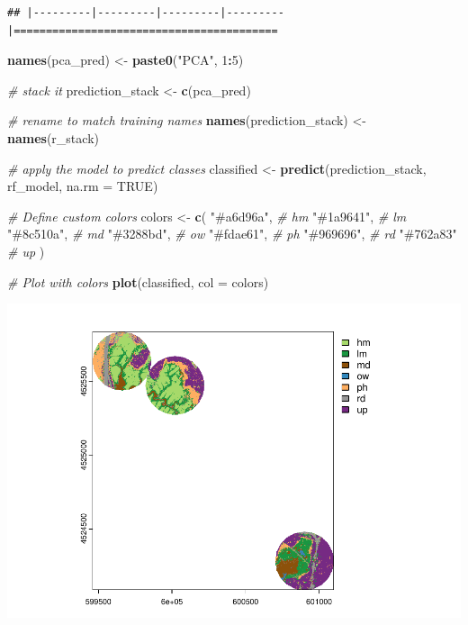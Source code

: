 \documentclass[
]{article}
\newenvironment{Shaded}{\begin{snugshade}}{\end{snugshade}}
\newcommand{\AttributeTok}[1]{\textcolor[rgb]{0.13,0.29,0.53}{#1}}
\newcommand{\CommentTok}[1]{\textcolor[rgb]{0.56,0.35,0.01}{\textit{#1}}}
\newcommand{\ConstantTok}[1]{\textcolor[rgb]{0.56,0.35,0.01}{#1}}
\newcommand{\DecValTok}[1]{\textcolor[rgb]{0.00,0.00,0.81}{#1}}
\newcommand{\FunctionTok}[1]{\textcolor[rgb]{0.13,0.29,0.53}{\textbf{#1}}}
\newcommand{\NormalTok}[1]{#1}
\newcommand{\OtherTok}[1]{\textcolor[rgb]{0.56,0.35,0.01}{#1}}
\newcommand{\SpecialCharTok}[1]{\textcolor[rgb]{0.81,0.36,0.00}{\textbf{#1}}}
\newcommand{\StringTok}[1]{\textcolor[rgb]{0.31,0.60,0.02}{#1}}
\begin{document}
\begin{verbatim}
## |---------|---------|---------|---------|=========================================                                          
\end{verbatim}

\begin{Shaded}
\begin{Highlighting}[]
\FunctionTok{names}\NormalTok{(pca\_pred) }\OtherTok{\textless{}{-}} \FunctionTok{paste0}\NormalTok{(}\StringTok{"PCA"}\NormalTok{, }\DecValTok{1}\SpecialCharTok{:}\DecValTok{5}\NormalTok{)}

\CommentTok{\# stack it}
\NormalTok{prediction\_stack }\OtherTok{\textless{}{-}} \FunctionTok{c}\NormalTok{(pca\_pred)}

\CommentTok{\# rename to match training names}
\FunctionTok{names}\NormalTok{(prediction\_stack) }\OtherTok{\textless{}{-}} \FunctionTok{names}\NormalTok{(r\_stack)}

\CommentTok{\# apply the model to predict classes}
\NormalTok{classified }\OtherTok{\textless{}{-}} \FunctionTok{predict}\NormalTok{(prediction\_stack, rf\_model, }\AttributeTok{na.rm =} \ConstantTok{TRUE}\NormalTok{)}

\CommentTok{\# Define custom colors}
\NormalTok{colors }\OtherTok{\textless{}{-}} \FunctionTok{c}\NormalTok{(}
  \StringTok{"\#a6d96a"}\NormalTok{,  }\CommentTok{\# hm  }
  \StringTok{"\#1a9641"}\NormalTok{,  }\CommentTok{\# lm  }
  \StringTok{"\#8c510a"}\NormalTok{,  }\CommentTok{\# md  }
  \StringTok{"\#3288bd"}\NormalTok{,  }\CommentTok{\# ow  }
  \StringTok{"\#fdae61"}\NormalTok{,  }\CommentTok{\# ph  }
  \StringTok{"\#969696"}\NormalTok{,  }\CommentTok{\# rd  }
  \StringTok{"\#762a83"}   \CommentTok{\# up  }
\NormalTok{)}



\CommentTok{\# Plot with colors}
\FunctionTok{plot}\NormalTok{(classified, }\AttributeTok{col =}\NormalTok{ colors)}
\end{Highlighting}
\end{Shaded}

\includegraphics{veg_model_files/figure-latex/unnamed-chunk-16-1.pdf}
\end{document}
